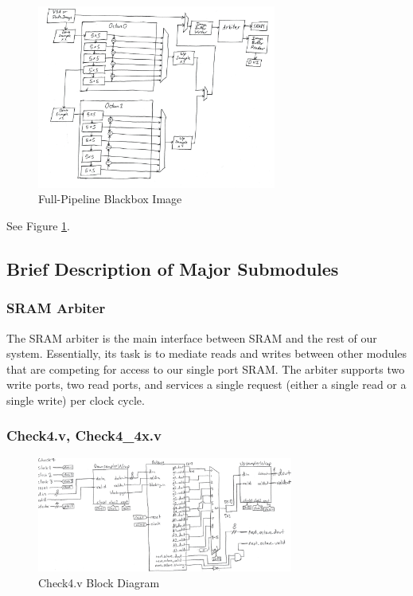 \begin{figure}
    \centering
    \includegraphics[width=0.7\textwidth]{processed_image_pngs/full_pipe_blackbox.png}
    \caption{Full-Pipeline Blackbox Image}
    \label{fig:full_pipe}
\end{figure}

See Figure \ref{fig:full_pipe}.


\subsection{Brief Description of Major Submodules}

\subsubsection{SRAM Arbiter}

The SRAM arbiter is the main interface between SRAM and the rest of our system.
Essentially, its task is to mediate reads and writes between other modules that
are competing for access to our single port SRAM. The arbiter supports two 
write ports, two read ports, and services a single request (either a single 
read or a single write) per clock cycle.

\subsubsection{Check4.v, Check4\_4x.v}

\begin{figure}
    \centering
    \includegraphics[width=0.75\textwidth]{processed_image_pngs/Check4.png}
    \caption{Check4.v Block Diagram}
    \label{fig:check_4}
\end{figure}

